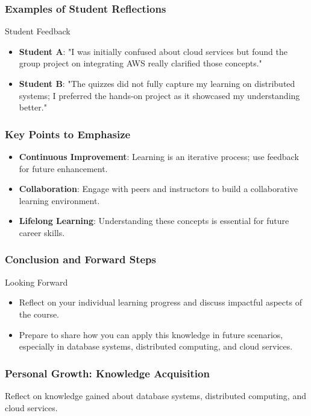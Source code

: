 \documentclass[aspectratio=169]{beamer}
\begin{document}
\begin{frame}[fragile]
  \frametitle{Examples of Student Reflections}
  \begin{block}{Student Feedback}
    \begin{itemize}
      \item \textbf{Student A}: "I was initially confused about cloud services but found the group project on integrating AWS really clarified those concepts."
      \item \textbf{Student B}: "The quizzes did not fully capture my learning on distributed systems; I preferred the hands-on project as it showcased my understanding better."
    \end{itemize}
  \end{block}
\end{frame}

\begin{frame}[fragile]
  \frametitle{Key Points to Emphasize}
  \begin{itemize}
    \item \textbf{Continuous Improvement}: Learning is an iterative process; use feedback for future enhancement.
    \item \textbf{Collaboration}: Engage with peers and instructors to build a collaborative learning environment.
    \item \textbf{Lifelong Learning}: Understanding these concepts is essential for future career skills.
  \end{itemize}
\end{frame}

\begin{frame}[fragile]
  \frametitle{Conclusion and Forward Steps}
  \begin{block}{Looking Forward}
    \begin{itemize}
      \item Reflect on your individual learning progress and discuss impactful aspects of the course.
      \item Prepare to share how you can apply this knowledge in future scenarios, especially in database systems, distributed computing, and cloud services.
    \end{itemize}
  \end{block}
\end{frame}

\begin{frame}[fragile]
    \frametitle{Personal Growth: Knowledge Acquisition}
    Reflect on knowledge gained about database systems, distributed computing, and cloud services.
\end{frame}
\end{document}
